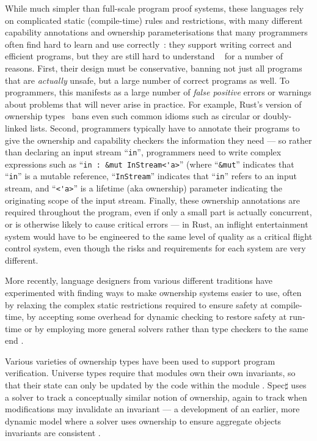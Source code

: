 While much simpler than full-scale program proof systems, these 
languages rely on complicated static (compile-time) rules and
restrictions, with many different capability annotations and ownership
parameterisations that many programmers often find hard to learn and use
correctly~\cite{LearnRust,VizRust,HardRust}: they support writing
 correct and efficient programs, but they are still hard to understand
~\cite{SafeRust,FightRust} for a number of
reasons. First, their design must be conservative, banning not just
all  programs that are \textit{actually} unsafe, but a large
number of correct programs as well.  To programmers, this
manifests as a large number of \textit{false positive} errors or
warnings about problems that will never arise in practice.  For
example, Rust's version of ownership types~\cite{RustBook} bans even
such common idioms such as circular or doubly-linked lists.  Second,
programmers typically have to annotate their programs to give the
ownership and capability checkers the information they need --- so
rather than declaring an input stream ``\verb+in+'', programmers need
to write complex expressions such as ``\verb+in : &mut InStream<'a>+''
(where ``\verb+&mut+'' indicates that ``\verb+in+'' is a mutable
reference, ``\verb+InStream+'' indicates that ``\verb+in+'' refers to
an input stream, and  ``\verb+<'a>+'' is a lifetime (aka ownership)
parameter indicating the originating scope of the input stream.
Finally, these ownership annotations are required throughout
the program,  even if only a small part is actually concurrent, or is
otherwise likely to cause critical errors --- in Rust, an inflight
entertainment system would have to be engineered to the same level of
quality as a critical flight control system, even though the risks and
requirements for each system are very different.

More recently, language designers from various different traditions
have experimented with finding ways to make ownership systems easier
to use, often by relaxing the complex static restrictions required to
ensure safety at compile-time, by accepting some overhead for dynamic
checking to restore safety at run-time
\cite{dafnydala-ftfjp2024,reggio-oopsla2023,gallifrey-pldi2022}
or by employing more general solvers rather than type checkers to the
same end \cite{Astrauskas2019,linear-dafny-oopsla2022,prusti}.



Various varieties of ownership types have been used to support program
verification. Universe types require that modules own their own
invariants, so that their state can only be updated by the code within
the module
\cite{pubsdoc:universe-types-encapsulation,DietlMueller05,MuellerPoetzsch-HeffterLeavens06}.
Spec$\sharp$ uses a solver to track a conceptually similar notion of
ownership, again to track when modifications may invalidate an
invariant --- a development of an earlier, more dynamic model where
a solver uses ownership to ensure aggregate objects invariants are
consistent \cite{verification-oo-invariants-jot2004}.

